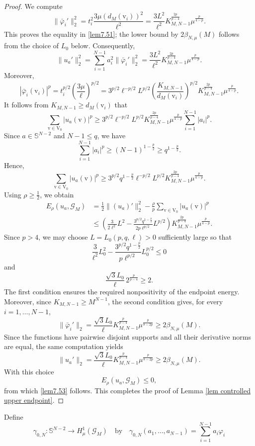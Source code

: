 \documentclass[11pt]{amsart}
\newcommand{\G}{\mathcal{G}}
\newcommand{\V}{\mathrm{V}}
\newcommand{\vv}{\mathrm{v}}
\numberwithin{equation}{section}
\begin{document}
\begin{proof}
We compute
$$
\|\bar{\varphi}_i'\|_2^2
=
t_i^2\frac{3\mu \left(d_M(\vv_i)\right)^2}{\ell^2}= \frac{3L^2}{\ell^2}
K^{\frac{2p}{p-4}}_{M,N-1}
\mu^\frac{p}{4-p}.
$$
This proves the equality in \ref{lem7.51}; the lower bound by $2\beta_{N,\mu}(M)$ follows from the choice of $L_0$ below.
Consequently,
$$
\|u_a'\|_2^2
=\sum_{i=1}^{N-1}a_i^2\|\bar{\varphi}_i'\|_2^2= \frac{3L^2}{\ell^2}
K^{\frac{2p}{p-4}}_{M,N-1}
\mu^\frac{p}{4-p}.
$$
Moreover,
$$
|\bar{\varphi}_i(\vv_i)|^p
=
t_i^{p/2}
\left(\frac{3\mu}{\ell}\right)^{p/2}=
3^{p/2}\ell^{-p/2}L^{p/2}
\left(\frac{K_{M,N-1}}{d_M(\vv_i)}\right)^{p/2}
K^{\frac{2p}{p-4}}_{M,N-1}\mu^{\frac{p}{4-p}}.
$$
It follows from $K_{M,N-1} \geq d_M(\vv_i)$ that
$$
\sum_{\vv\in\V_0}|u_a(\vv)|^p
\geq
3^{p/2}\ell^{-p/2}L^{p/2}
K^{\frac{2p}{p-4}}_{M,N-1}\mu^{\frac{p}{4-p}}
\sum_{i=1}^{N-1}|a_i|^p.
$$
Since $a\in\mathbb S^{N-2}$ and $N-1\leq q$, we have
$$
\sum_{i=1}^{N-1}|a_i|^p
\geq
(N-1)^{1-\frac p2}
\geq
q^{1-\frac p2}.
$$
Hence,
$$
\sum_{\vv\in\V_0}|u_a(\vv)|^p
\geq
3^{p/2}q^{1-\frac p2}\ell^{-p/2}L^{p/2}
K^{\frac{2p}{p-4}}_{M,N-1}\mu^{\frac{p}{4-p}}.
$$
Using $\rho\geq\frac12$, we obtain
$$
\begin{aligned}
E_\rho(u_a,\G_M)
&=
\frac12\|(u_a)'\|_2^2
-
\frac{\rho}{p}
\sum_{\vv\in\V_0}|u_a(\vv)|^p
\\
&\leq
\left(
\frac{3}{2\ell^2}L^2
-
\frac{3^{p/2}q^{1-\frac p2}}{2p\ell^{p/2}}L^{p/2}
\right)
K^{\frac{2p}{p-4}}_{M,N-1}\mu^{\frac{p}{4-p}}.
\end{aligned}
$$
Since $p>4$, we may choose $L=L_0(p,q,\ell)>0$ sufficiently large so that
\[
\frac{3}{\ell^2}L_0^2
-
\frac{3^{p/2}q^{1-\frac p2}}{p\ell^{p/2}}L_0^{p/2}
\leq0
\]
and
\[
\frac{\sqrt{3}L_0}{\ell}\,2^{\frac{p}{p-4}}\geq2.
\]
The first condition ensures the required nonpositivity of the endpoint energy. Moreover, since $K_{M,N-1}\geq M^{N-1}$, the second condition gives, for every $i=1,\ldots,N-1$,
\[
\|\bar{\varphi}_i'\|_2
=\frac{\sqrt{3}L_0}{\ell}K_{M,N-1}^{\frac{p}{p-4}}
\mu^{\frac{p}{8-2p}}
\geq2\beta_{N,\mu}(M).
\]
Since the functions have pairwise disjoint supports and all their derivative norms are equal, the same computation yields
\[
\|u_a'\|_2
=\frac{\sqrt{3}L_0}{\ell}K_{M,N-1}^{\frac{p}{p-4}}
\mu^{\frac{p}{8-2p}}
\geq2\beta_{N,\mu}(M).
\]
With this choice
$$
E_\rho(u_a,\G_M)\leq 0,
$$ 
from which \ref{lem7.53} follows.
This completes the proof of Lemma \ref{lem controlled upper endpoint}.
\end{proof}
Define
$$
\gamma_{0,N}:\mathbb S^{N-2}\to H^1_\mu(\G_M)\quad\text{by}\quad\gamma_{0,N}(a_{1}, \ldots,a_{N-1})=\sum_{i=1}^{N-1}a_{i}\varphi_{i}
$$
\end{document}
